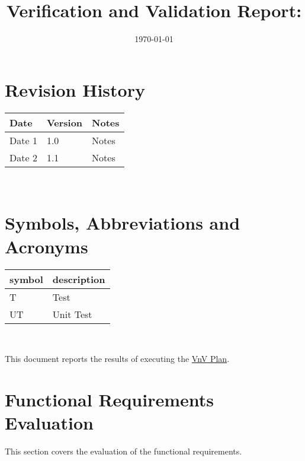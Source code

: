 \documentclass[12pt, titlepage]{article}
\begin{document}
\title{Verification and Validation Report: \progname} 
\author{\authname}
\date{\today}
	
\maketitle


\section{Revision History}

\begin{tabularx}{\textwidth}{p{3cm}p{2cm}X}
\toprule {\bf Date} & {\bf Version} & {\bf Notes}\\
\midrule
Date 1 & 1.0 & Notes\\
Date 2 & 1.1 & Notes\\
\bottomrule
\end{tabularx}

~\newpage

\section{Symbols, Abbreviations and Acronyms}

\renewcommand{\arraystretch}{1.2}
\begin{tabular}{l l} 
  \toprule		
  \textbf{symbol} & \textbf{description} \\
  \midrule 
  T               & Test                 \\
  UT              & Unit Test            \\
  \bottomrule
\end{tabular}\\


\newpage

\tableofcontents

\listoftables %

\listoffigures %

\newpage


This document reports the results of executing the
\href{https://github.com/mirzaim/ipcs/blob/main/docs/VnVPlan/VnVPlan.pdf}{VnV Plan}.

\section{Functional Requirements Evaluation}
This section covers the evaluation of the functional requirements.
\end{document}
